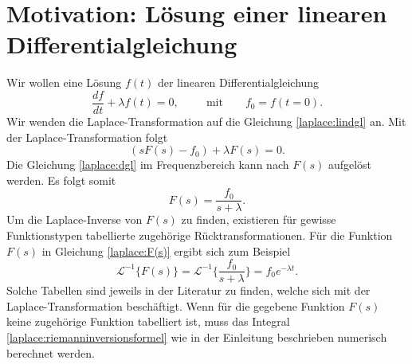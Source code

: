 %
%
%



\section{Motivation: Lösung einer linearen Differentialgleichung
\label{laplace:section:problemstellung}}
Wir wollen eine Lösung $f(t)$ der linearen Differentialgleichung 
\begin{equation}
\frac{df}{dt} + \lambda f(t) = 0, \qquad ~~ \text{mit} \qquad f_{0} = f(t=0).
\label{laplace:lindgl}
\end{equation}
Wir wenden die Laplace-Transformation auf die Gleichung \eqref{laplace:lindgl} an. Mit der Laplace-Transformation folgt
%
\begin{equation}
(sF(s) - f_{0}) + \lambda F(s) = 0.
\label{laplace:dgl}
\end{equation}
Die Gleichung \eqref{laplace:dgl} im Frequenzbereich kann nach $F(s)$ aufgelöst werden.
%
Es folgt somit
\begin{equation}
F(s) = \frac{f_{0}}{s + \lambda}.
\label{laplace:F(s)}
\end{equation}
Um die Laplace-Inverse von $F(s)$ zu finden, existieren für gewisse Funktionstypen tabellierte zugehörige Rücktransformationen.
%
%
Für die Funktion $F(s)$ in Gleichung \eqref{laplace:F(s)} ergibt sich zum Beispiel
\begin{equation}
\mathcal{L}^{-1}\{F(s)\}=\mathcal{L}^{-1}\biggl\{\frac{f_{0}}{s+\lambda}\biggr\} = f_{0}e^{-\lambda t}.
\end{equation}
Solche Tabellen sind jeweils in der Literatur zu finden, welche sich mit der Laplace-Transformation beschäftigt.
Wenn für die gegebene Funktion $F(s)$ keine zugehörige Funktion tabelliert ist, muss das Integral \eqref{laplace:riemanninversionsformel} wie in der Einleitung beschrieben numerisch berechnet werden.


